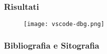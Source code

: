 \documentclass[aspectratio=169, handout]{beamer}
\begin{document}
    \begin{frame}
        \frametitle{Risultati}
        
        \begin{figure}
            \texttt{[image: vscode-dbg.png]}
        \end{figure}
    
    \end{frame}

    \begin{frame}
        \frametitle{Bibliografia e Sitografia}
        \printbibliography[heading=none]%
    \end{frame}

    \begin{frame}
    \end{frame}
\end{document}
